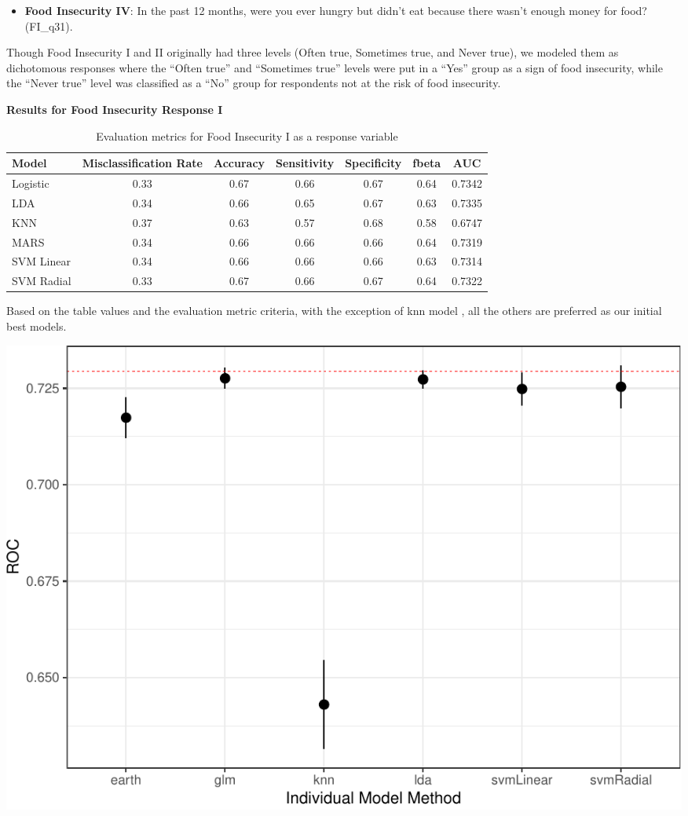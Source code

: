 \documentclass[
  10pt,
]{article}
\providecommand{\tightlist}{%
  \setlength{\itemsep}{0pt}\setlength{\parskip}{0pt}}
\begin{document}
\begin{itemize}
\tightlist
\item
  \textbf{Food Insecurity IV}: In the past 12 months, were you ever hungry but didn't eat because there wasn't enough money for food? (FI\_q31).
\end{itemize}

Though Food Insecurity I and II originally had three levels (Often true, Sometimes true, and Never true), we modeled them as dichotomous responses where the ``Often true'' and ``Sometimes true'' levels were put in a ``Yes'' group as a sign of food insecurity, while the ``Never true'' level was classified as a ``No'' group for respondents not at the risk of food insecurity.

\textbf{Results for Food Insecurity Response I}

\begin{table}[H]

\caption{\label{tab:unnamed-chunk-17}Evaluation metrics for Food Insecurity I  as a response variable}
\centering
\fontsize{12}{14}\selectfont
\begin{tabular}[t]{lcccccc}
\toprule
Model & Misclassification Rate & Accuracy & Sensitivity & Specificity & fbeta & AUC\\
\midrule
Logistic & 0.33 & 0.67 & 0.66 & 0.67 & 0.64 & 0.7342\\
LDA & 0.34 & 0.66 & 0.65 & 0.67 & 0.63 & 0.7335\\
KNN & 0.37 & 0.63 & 0.57 & 0.68 & 0.58 & 0.6747\\
MARS & 0.34 & 0.66 & 0.66 & 0.66 & 0.64 & 0.7319\\
SVM Linear & 0.34 & 0.66 & 0.66 & 0.66 & 0.63 & 0.7314\\
SVM Radial & 0.33 & 0.67 & 0.66 & 0.67 & 0.64 & 0.7322\\
\bottomrule
\end{tabular}
\end{table}

Based on the table values and the evaluation metric criteria, with the exception of knn model , all the others are preferred as our initial best models.\\

\begin{center}\includegraphics{final_phase2_report_files/figure-latex/unnamed-chunk-18-1} \end{center}
\end{document}
